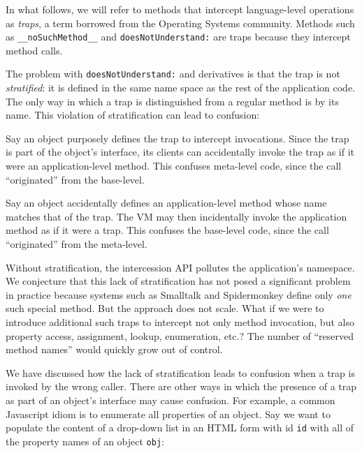 \documentclass{sig-alternate}
\newcommand{\noSuchMethod}{\texttt{\_\_noSuchMethod\_\_}}
\begin{document}
In what follows, we will refer to methods that intercept language-level operations as \emph{traps}, a term borrowed from the Operating Systems community. Methods such as \noSuchMethod{} and \texttt{doesNotUnderstand:} are traps because they intercept method calls.

The problem with \texttt{doesNotUnderstand:} and derivatives is that the trap is not \emph{stratified}: it is defined in the same name space as the rest of the application code. The only way in which a trap is distinguished from a regular method is by its name. This violation of stratification can lead to confusion:

\begin{itemize*}
  \item Say an object purposely defines the trap to intercept invocations. Since the trap is part of the object's interface, its clients can accidentally invoke the trap as if it were an application-level method. This confuses meta-level code, since the call ``originated'' from the base-level.
  \item Say an object accidentally defines an application-level method whose name matches that of the trap. The VM may then incidentally invoke the application method as if it were a trap. This confuses the base-level code, since the call ``originated'' from the meta-level.
\end{itemize*}

Without stratification, the intercession API pollutes the application's namespace.
We conjecture that this lack of stratification has not posed a significant problem in practice because systems such as Smalltalk and Spidermonkey define only \emph{one} such special method. But the approach does not scale. What if we were to introduce additional such traps to intercept not only method invocation, but also property access, assignment, lookup, enumeration, etc.? The number of ``reserved method names'' would quickly grow out of control.

We have discussed how the lack of stratification leads to confusion when a trap is invoked by the wrong caller. There are other ways in which the presence of a trap as part of an object's interface may cause confusion. For example, a common Javascript idiom is to enumerate all properties of an object. Say we want to populate the content of a drop-down list in an HTML form with id \texttt{id} with all of the property names of an object \texttt{obj}:
\end{document}
